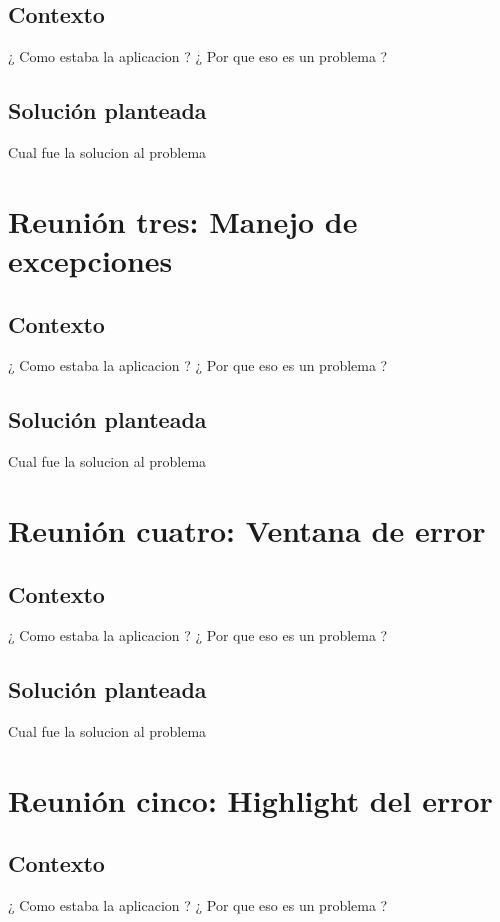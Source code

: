 \documentclass[a4paper,oneside,10pt]{article}
\begin{document}
\subsection{Contexto}
¿ Como estaba la aplicacion ? ¿ Por que eso es un problema ?

\subsection{Soluci\'on planteada}
Cual fue la solucion al problema

\section{Reuni\'on tres: Manejo de excepciones}

\subsection{Contexto}
¿ Como estaba la aplicacion ? ¿ Por que eso es un problema ?

\subsection{Soluci\'on planteada}
Cual fue la solucion al problema

\section{Reuni\'on cuatro: Ventana de error}

\subsection{Contexto}
¿ Como estaba la aplicacion ? ¿ Por que eso es un problema ?

\subsection{Soluci\'on planteada}
Cual fue la solucion al problema

\section{Reuni\'on cinco: Highlight del error}

\subsection{Contexto}
¿ Como estaba la aplicacion ? ¿ Por que eso es un problema ?
\end{document}
